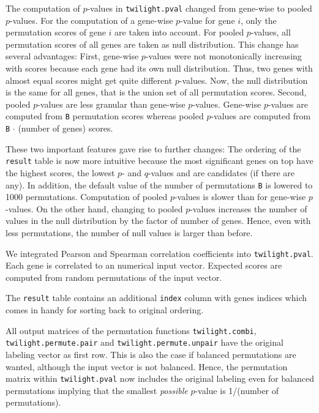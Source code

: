\documentclass[11pt,a4paper,fleqn]{article}
\newcommand{\Robject}[1]{{\texttt{#1}}}
\newcommand{\Rfunction}[1]{{\texttt{#1}}}
\newcommand{\Rfunarg}[1]{{\texttt{#1}}}
\begin{document}
The computation of $p$-values in \Rfunction{twilight.pval} changed from gene-wise to pooled $p$-values. For the computation of a gene-wise $p$-value for gene $i$, only the permutation scores of gene $i$ are taken into account. For pooled $p$-values, all permutation scores of all genes are taken as null distribution. This change has several advantages: First, gene-wise $p$-values were not monotonically increasing with scores because each gene had its own null distribution. Thus, two genes with almost equal scores might get quite different $p$-values. Now, the null distribution is the same for all genes, that is the union set of all permutation scores. Second, pooled $p$-values are less granular than gene-wise $p$-values. Gene-wise $p$-values are computed from \Rfunarg{B} permutation scores whereas pooled $p$-values are computed from \Rfunarg{B} $\cdot$ (number of genes) scores.

These two important features gave rise to further changes: The ordering of the \Robject{result} table is now more intuitive because the most significant genes on top have the highest scores, the lowest $p$- and $q$-values and are candidates (if there are any). In addition, the default value of the number of permutations \Rfunarg{B} is lowered to 1000 permutations. Computation of pooled $p$-values is slower than for gene-wise $p$-values. On the other hand, changing to pooled $p$-values increases the number of values in the null distribution by the factor of number of genes. Hence, even with less permutations, the number of null values is larger than before.

We integrated Pearson and Spearman correlation coefficients into \Rfunction{twilight.pval}. Each gene is correlated to an numerical input vector. Expected scores are computed from random permutations of the input vector.

The \Robject{result} table contains an additional \Robject{index} column with genes indices which comes in handy for sorting back to original ordering.

All output matrices of the permutation functions \Rfunction{twilight.combi}, \Rfunction{twilight.permute.pair} and \Rfunction{twilight.permute.unpair} have the original labeling vector as first row. This is also the case if balanced permutations are wanted, although the input vector is not balanced. Hence, the permutation matrix within \Rfunction{twilight.pval} now includes the original labeling even for balanced permutations implying that the smallest \textit{possible} $p$-value is 1/(number of permutations).
\end{document}

